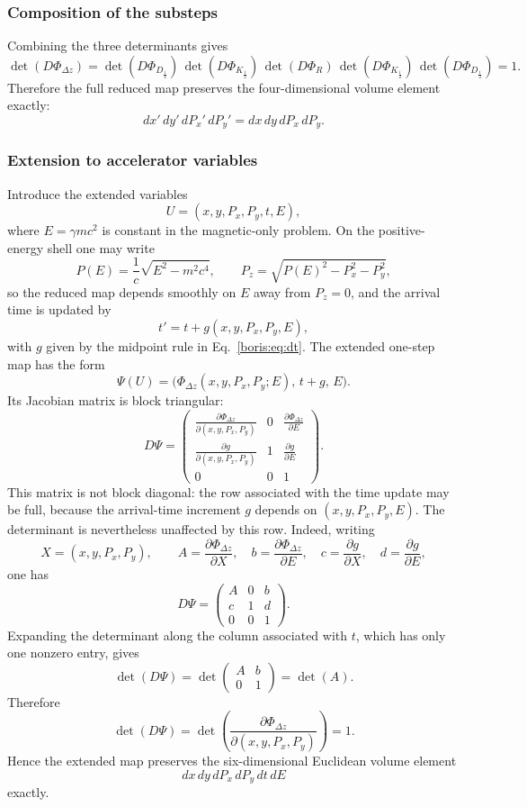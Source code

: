 \subsubsection{Composition of the substeps}
Combining the three determinants gives
\[
\det(D\Phi_{\Delta z})
= \det(D\Phi_{D_{\frac12}})\,\det(D\Phi_{K_{\frac12}})\,\det(D\Phi_R)\,
  \det(D\Phi_{K_{\frac12}})\,\det(D\Phi_{D_{\frac12}})
= 1.
\]
Therefore the full reduced map preserves the four-dimensional volume element
exactly:
\[
dx'\,dy'\,dP_x'\,dP_y' = dx\,dy\,dP_x\,dP_y.
\]

\subsubsection{Extension to accelerator variables}
Introduce the extended variables
\[
U = (x,y,P_x,P_y,t,E),
\]
where \(E=\gamma mc^2\) is constant in the magnetic-only problem.
On the positive-energy shell one may write
\[
P(E)=\frac{1}{c}\sqrt{E^2-m^2c^4},
\qquad
P_z=\sqrt{P(E)^2-P_x^2-P_y^2},
\]
so the reduced map depends smoothly on \(E\) away from \(P_z=0\), and the
arrival time is updated by
\[
t' = t + g(x,y,P_x,P_y,E),
\]
with \(g\) given by the midpoint rule in Eq.~\eqref{boris:eq:dt}.
The extended one-step map has the form
\[
\Psi(U) = \bigl(\Phi_{\Delta z}(x,y,P_x,P_y;E),\, t+g,\, E\bigr).
\]
Its Jacobian matrix is block triangular:
\[
D\Psi =
\begin{pmatrix}
\displaystyle \frac{\partial \Phi_{\Delta z}}{\partial (x,y,P_x,P_y)} & 0 &
\displaystyle \frac{\partial \Phi_{\Delta z}}{\partial E}\\[10pt]
\displaystyle \frac{\partial g}{\partial (x,y,P_x,P_y)} & 1 &
\displaystyle \frac{\partial g}{\partial E}\\[10pt]
0 & 0 & 1
\end{pmatrix}.
\]
This matrix is not block diagonal: the row associated with the time update may
be full, because the arrival-time increment \(g\) depends on
\((x,y,P_x,P_y,E)\).  The determinant is nevertheless unaffected by this row.
Indeed, writing
\[
X=(x,y,P_x,P_y),\qquad
A=\frac{\partial\Phi_{\Delta z}}{\partial X},\quad
b=\frac{\partial\Phi_{\Delta z}}{\partial E},\quad
c=\frac{\partial g}{\partial X},\quad
d=\frac{\partial g}{\partial E},
\]
one has
\[
D\Psi=
\begin{pmatrix}
A & 0 & b\\
c & 1 & d\\
0 & 0 & 1
\end{pmatrix}.
\]
Expanding the determinant along the column associated with \(t\), which has
only one nonzero entry, gives
\[
\det(D\Psi)
=
\det
\begin{pmatrix}
A & b\\
0 & 1
\end{pmatrix}
=\det(A).
\]
Therefore
\[
\det(D\Psi)
= \det\!\left(
\frac{\partial \Phi_{\Delta z}}{\partial (x,y,P_x,P_y)}
\right)
= 1.
\]
Hence the extended map preserves the six-dimensional Euclidean volume element
\[
dx\,dy\,dP_x\,dP_y\,dt\,dE
\]
exactly.

